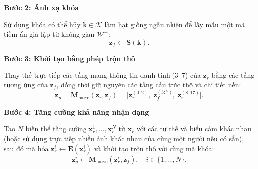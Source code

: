 \par\medskip\noindent\textbf{Bước 2: Ánh xạ khóa}\par\smallskip
Sử dụng khóa có thể hủy $\mathbf{k} \in \mathcal{K}$ làm hạt giống ngẫu nhiên để lấy mẫu một mã tiềm ẩn giả lập từ không gian $\mathcal{W}^+$:
\[
\mathbf{z}_f \leftarrow \mathbf{S}(\mathbf{k}).
\]

\par\medskip\noindent\textbf{Bước 3: Khởi tạo bằng phép trộn thô}\par\smallskip
Thay thế trực tiếp các tầng mang thông tin danh tính ($3\text{--}7$) của $\mathbf{z}_r$ bằng các tầng tương ứng của $\mathbf{z}_f$, đồng thời giữ nguyên các tầng cấu trúc thô và chi tiết nền:
\begin{equation}
\mathbf{z}_p = \mathbf{M}_{\text{naive}}(\mathbf{z}_r, \mathbf{z}_f) = \bigl[\mathbf{z}_r^{(0:2)},\; \mathbf{z}_f^{(3:7)},\; \mathbf{z}_r^{(8:17)}\bigr].
\end{equation}

\par\medskip\noindent\textbf{Bước 4: Tăng cường khả năng nhận dạng}\par\smallskip
Tạo $N$ biến thể tăng cường $\mathbf{x}_r^1, \dots, \mathbf{x}_r^N$ từ $\mathbf{x}_r$ với các tư thế và biểu cảm khác nhau (hoặc sử dụng trực tiếp nhiều ảnh khác nhau của cùng một người nếu có sẵn), sau đó mã hóa $\mathbf{z}_r^i \leftarrow \mathbf{E}(\mathbf{x}_r^i)$ và khởi tạo trộn thô với cùng mã khóa:
\[
\mathbf{z}_p^i \leftarrow \mathbf{M}_{\text{naive}}(\mathbf{z}_r^i, \mathbf{z}_f), \quad i \in \{1, \dots, N\}.
\]

